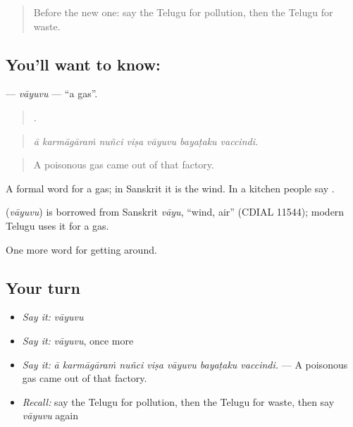 \label{lesson:TE-C470-vayuvu}



\begin{quote}
Before the new one: say the Telugu for pollution, then the Telugu for waste.
\end{quote}

\subsection*{You'll want to know: }
\textbf{} — \emph{vāyuvu} — \textquotedblleft{}a gas\textquotedblright{}.

\begin{quote}
      .
\end{quote}

\begin{quote}
\emph{ā karmāgāraṁ nuñci viṣa vāyuvu bayaṭaku vaccindi.}
\end{quote}

\begin{quote}
A poisonous gas came out of that factory.
\end{quote}

A formal word for a gas; in Sanskrit it is the wind. In a kitchen people say .

\begin{cousinweb}
\textbf{} (\emph{vāyuvu}) is borrowed from Sanskrit \emph{vāyu}, \textquotedblleft{}wind, air\textquotedblright{} (CDIAL 11544); modern Telugu uses it for a gas.
\end{cousinweb}

\begin{grammarlens}[title={What you've built}]
One more word for getting around.
\end{grammarlens}

\subsection*{Your turn}
\begin{itemize}
\raggedright
  \item \emph{Say it:} \emph{vāyuvu}
  \item \emph{Say it:} \emph{vāyuvu}, once more
  \item \emph{Say it:} \emph{ā karmāgāraṁ nuñci viṣa vāyuvu bayaṭaku vaccindi.} — A poisonous gas came out of that factory.
  \item \emph{Recall:} say the Telugu for pollution, then the Telugu for waste, then say \emph{vāyuvu} again
\end{itemize}

